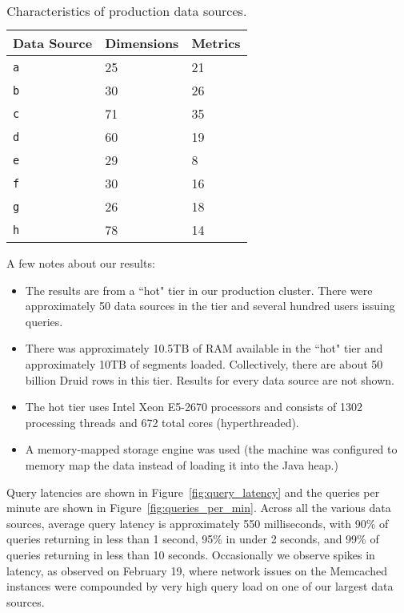 \documentclass{sig-alternate-2013}
\begin{document}
\begin{table}
  \centering
  \scriptsize\begin{tabular}{| l | l | l |}
    \hline
    \textbf{Data Source} & \textbf{Dimensions} & \textbf{Metrics} \\ \hline
    \texttt{a} & 25 & 21 \\ \hline
    \texttt{b} & 30 & 26 \\ \hline
    \texttt{c} & 71 & 35 \\ \hline
    \texttt{d} & 60 & 19 \\ \hline
    \texttt{e} & 29 & 8 \\ \hline
    \texttt{f} & 30 & 16 \\ \hline
    \texttt{g} & 26 & 18 \\ \hline
    \texttt{h} & 78 & 14 \\ \hline
  \end{tabular}
  \normalsize
  \caption{Characteristics of production data sources.}
  \label{tab:datasources}
\end{table}

A few notes about our results:
\begin{itemize}[leftmargin=*,beginpenalty=5000,topsep=0pt]
\item The results are from a ``hot" tier in our production cluster. There were
approximately 50 data sources in the tier and several hundred users issuing
queries.

\item There was approximately 10.5TB of RAM available in the ``hot" tier and
approximately 10TB of segments loaded. Collectively,
there are about 50 billion Druid rows in this tier. Results for
every data source are not shown.

\item The hot tier uses Intel\textsuperscript{\textregistered} Xeon\textsuperscript{\textregistered} E5-2670 processors and consists of 1302 processing
threads and 672 total cores (hyperthreaded).

\item A memory-mapped storage engine was used (the machine was configured to
    memory map the data instead of loading it into the Java heap.)
\end{itemize}

Query latencies are shown in Figure~\ref{fig:query_latency} and the queries per
minute are shown in Figure~\ref{fig:queries_per_min}. Across all the various
data sources, average query latency is approximately 550 milliseconds, with
90\% of queries returning in less than 1 second, 95\% in under 2 seconds, and
99\% of queries returning in less than 10 seconds. Occasionally we observe
spikes in latency, as observed on February 19, where network issues on
the Memcached instances were compounded by very high query load on one of our
largest data sources.
\end{document}
